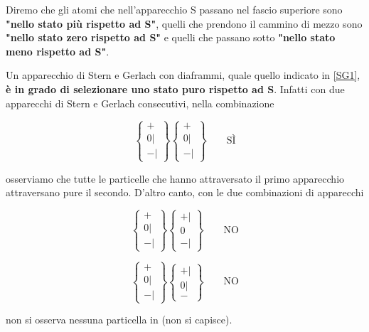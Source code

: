 \documentclass[a4paper,12pt,oneside]{book}
\begin{document}
 
Diremo che gli atomi che nell'apparecchio S passano nel fascio superiore sono \textbf{"nello stato più rispetto ad S"}, quelli che prendono il cammino di mezzo sono \textbf{"nello stato zero rispetto ad S"} e quelli che passano sotto \textbf{"nello stato meno rispetto ad S"}.

Un apparecchio di Stern e Gerlach con diaframmi, quale quello indicato in \eqref{SG1}, \textbf{è in grado di selezionare uno stato puro rispetto ad S}. Infatti con due apparecchi di Stern e Gerlach consecutivi, nella combinazione

\begin{equation}
\begin{Bmatrix}
 + \\ 0 | \\ - |  
\end{Bmatrix}
\begin{Bmatrix}
 + \\ 0 | \\ - |  
\end{Bmatrix} \qquad \text{SÌ}
\label{SG2}
\end{equation}
 
osserviamo che tutte le particelle che hanno attraversato il primo apparecchio attraversano pure il secondo. D'altro canto, con le due combinazioni di apparecchi

\begin{equation}
\begin{Bmatrix}
 + \\ 0 | \\ - |  
\end{Bmatrix}
\begin{Bmatrix}
 + |  \\ 0  \\ - |  
\end{Bmatrix} \qquad \text{NO}
\label{SG3}
\end{equation}

\begin{equation}
\begin{Bmatrix}
 + \\ 0 | \\ - |  
\end{Bmatrix}
\begin{Bmatrix}
 + |  \\ 0|  \\ -  
\end{Bmatrix} \qquad \text{NO}
\label{SG4}
\end{equation}

non si osserva nessuna particella in (non si capisce).
\end{document}
